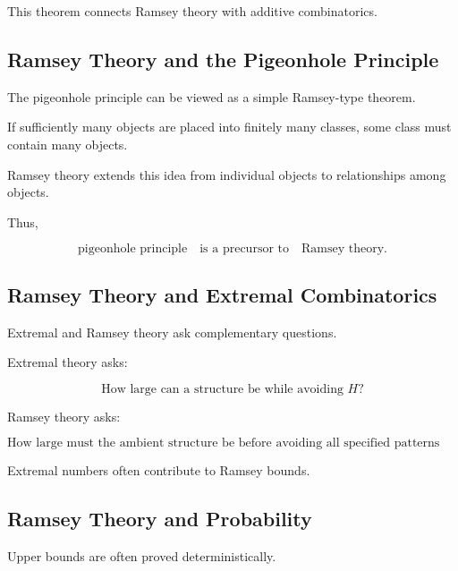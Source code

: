 This theorem connects Ramsey theory with additive combinatorics.

\subsection{Ramsey Theory and the Pigeonhole Principle}
\label{subsec:ramsey-pigeonhole}

The pigeonhole principle can be viewed as a simple Ramsey-type theorem.

If sufficiently many objects are placed into finitely many classes,
some class must contain many objects.

Ramsey theory extends this idea from individual objects to relationships
among objects.

Thus,

\[
\boxed{
\text{pigeonhole principle}
\quad\text{is a precursor to}\quad
\text{Ramsey theory}.
}
\]

\subsection{Ramsey Theory and Extremal Combinatorics}
\label{subsec:ramsey-extremal-connection}

Extremal and Ramsey theory ask complementary questions.

Extremal theory asks:

\[
\boxed{
\text{How large can a structure be while avoiding }H?
}
\]

Ramsey theory asks:

\[
\boxed{
\text{How large must the ambient structure be before avoiding all
specified patterns becomes impossible?}
}
\]

Extremal numbers often contribute to Ramsey bounds.

\subsection{Ramsey Theory and Probability}
\label{subsec:ramsey-probability-connection}

Upper bounds are often proved deterministically.

